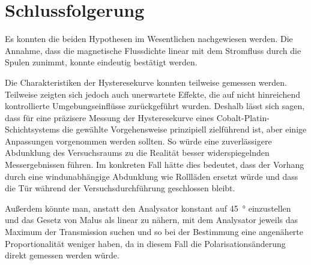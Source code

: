 \documentclass[
	a4paper,
	12pt,
	pagesize,
	ngerman
]{scrartcl}
\begin{document}
	
	\section{Schlussfolgerung}
	Es konnten die beiden Hypothesen im Wesentlichen nachgewiesen werden.
	Die Annahme, dass die magnetische Flussdichte linear mit dem Stromfluss durch die Spulen zunimmt, konnte eindeutig bestätigt werden.
	
	Die Charakteristiken der Hysteresekurve konnten teilweise gemessen werden.
	Teilweise zeigten sich jedoch auch unerwartete Effekte, die auf nicht hinreichend kontrollierte Umgebungseinflüsse zurückgeführt wurden.
	Deshalb lässt sich sagen, dass für eine präzisere Messung der Hysteresekurve eines Cobalt-Platin-Schichtsystems die gewählte Vorgehensweise prinzipiell zielführend ist, aber einige Anpassungen vorgenommen werden sollten.
	So würde eine zuverlässigere Abdunklung des Versuchsraums zu die Realität besser widerspiegelnden Messergebnissen führen.
	Im konkreten Fall hätte dies bedeutet, dass der Vorhang durch eine windunabhängige Abdunklung wie Rollläden ersetzt würde und dass die Tür während der Versuchsdurchführung geschlossen bleibt.
	
	Außerdem könnte man, anstatt den Analysator konstant auf \SI{45}{\degree} einzustellen und das Gesetz von Malus als linear zu nähern, mit dem Analysator jeweils das Maximum der Transmission suchen und so bei der Bestimmung eine angenäherte Proportionalität weniger haben, da in diesem Fall die Polarisationsänderung direkt gemessen werden würde. %
\end{document}
